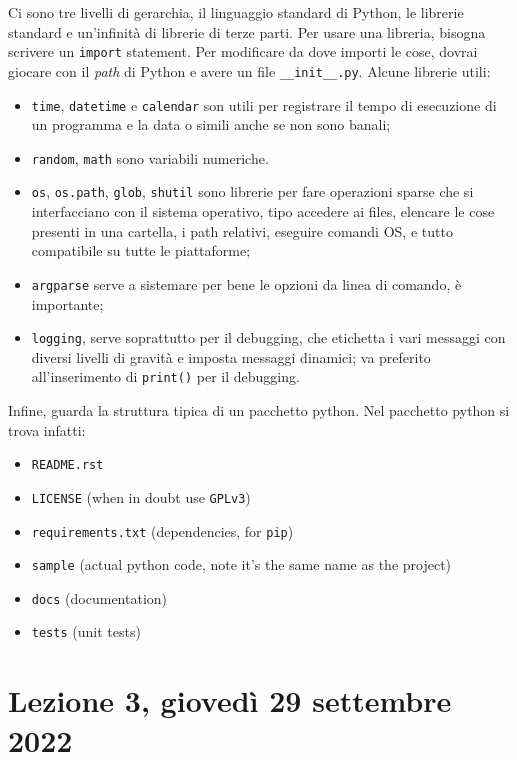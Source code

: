 \documentclass[10pt, a4paper, titlepage]{book}
\begin{document}
Ci sono tre livelli di gerarchia, il linguaggio standard di Python, le librerie standard e un'infinità di librerie di terze parti.
Per usare una libreria, bisogna scrivere un \texttt{import} statement.
Per modificare da dove importi le cose, dovrai giocare con il \textit{path} di Python e avere un file \texttt{__init__.py}.
Alcune librerie utili:
\begin{itemize}
	\item \texttt{time}, \texttt{datetime} e \texttt{calendar} son utili per registrare il tempo di esecuzione di un programma e la data o simili anche se non sono banali;
	\item \texttt{random}, \texttt{math} sono variabili numeriche.
	\item \texttt{os}, \texttt{os.path}, \texttt{glob}, \texttt{shutil} sono librerie per fare operazioni sparse che si interfacciano con il sistema operativo, tipo accedere ai files, elencare le cose presenti in una cartella, i path relativi, eseguire comandi OS, e tutto compatibile su tutte le piattaforme;
	\item \texttt{argparse} serve a sistemare per bene le opzioni da linea di comando, è importante;
	\item \texttt{logging}, serve soprattutto per il debugging, che etichetta i vari messaggi con diversi livelli di gravità e imposta messaggi dinamici; va preferito all'inserimento di \texttt{print()} per il debugging.
\end{itemize}

Infine, guarda la struttura tipica di un pacchetto python. Nel pacchetto python si trova infatti:
\begin{itemize}
	\item \texttt{README.rst}

	\item \texttt{LICENSE} (when in doubt use \texttt{GPLv3})

	\item \texttt{requirements.txt} (dependencies, for \texttt{pip})

	\item \texttt{sample} (actual python code, note it's the same name as the project)

	\item \texttt{docs} (documentation)

	\item \texttt{tests} (unit tests)
\end{itemize}

\section{Lezione 3, giovedì 29 settembre 2022}
\end{document}

